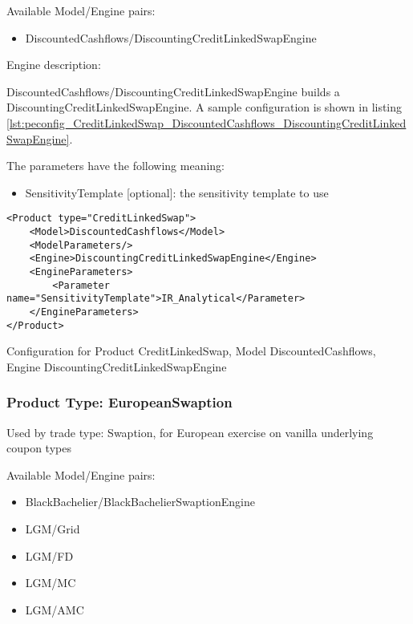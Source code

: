 Available Model/Engine pairs:

\begin{itemize}
\item DiscountedCashflows/DiscountingCreditLinkedSwapEngine
\end{itemize}

Engine description:

DiscountedCashflows/DiscountingCreditLinkedSwapEngine builds a DiscountingCreditLinkedSwapEngine. A sample configuration is shown
in listing \ref{lst:peconfig_CreditLinkedSwap_DiscountedCashflows_DiscountingCreditLinkedSwapEngine}.

The parameters have the following meaning:

\begin{itemize}
\item SensitivityTemplate [optional]: the sensitivity template to use 
\end{itemize}

\begin{longlisting}
\begin{verbatim}
<Product type="CreditLinkedSwap">
    <Model>DiscountedCashflows</Model>
    <ModelParameters/>
    <Engine>DiscountingCreditLinkedSwapEngine</Engine>
    <EngineParameters>
        <Parameter name="SensitivityTemplate">IR_Analytical</Parameter>
    </EngineParameters>
</Product>
\end{verbatim}
\caption{Configuration for Product CreditLinkedSwap, Model DiscountedCashflows, Engine DiscountingCreditLinkedSwapEngine}
\label{lst:peconfig_CreditLinkedSwap_DiscountedCashflows_DiscountingCreditLinkedSwapEngine}
\end{longlisting}

\subsubsection{Product Type: EuropeanSwaption}

Used by trade type: Swaption, for European exercise on vanilla underlying coupon types

Available Model/Engine pairs:

\begin{itemize}
\item BlackBachelier/BlackBachelierSwaptionEngine
\item LGM/Grid
\item LGM/FD
\item LGM/MC
\item LGM/AMC
\end{itemize}

